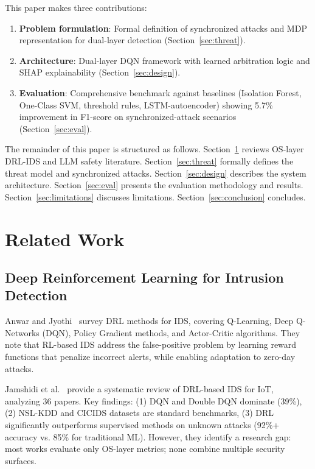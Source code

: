 \documentclass[conference]{IEEEtran}
\begin{document}
This paper makes three contributions:
\begin{enumerate}
\item \textbf{Problem formulation}: Formal definition of synchronized attacks and MDP representation for dual-layer detection (Section~\ref{sec:threat}).
\item \textbf{Architecture}: Dual-layer DQN framework with learned arbitration logic and SHAP explainability (Section~\ref{sec:design}).
\item \textbf{Evaluation}: Comprehensive benchmark against baselines (Isolation Forest, One-Class SVM, threshold rules, LSTM-autoencoder) showing 5.7\% improvement in F1-score on synchronized-attack scenarios (Section~\ref{sec:eval}).
\end{enumerate}

The remainder of this paper is structured as follows. Section~\ref{sec:related} reviews OS-layer DRL-IDS and LLM safety literature. Section~\ref{sec:threat} formally defines the threat model and synchronized attacks. Section~\ref{sec:design} describes the system architecture. Section~\ref{sec:eval} presents the evaluation methodology and results. Section~\ref{sec:limitations} discusses limitations. Section~\ref{sec:conclusion} concludes.

\section{Related Work}\label{sec:related}

\subsection{Deep Reinforcement Learning for Intrusion Detection}

Anwar and Jyothi~\cite{anwar2023survey} survey DRL methods for IDS, covering Q-Learning, Deep Q-Networks (DQN), Policy Gradient methods, and Actor-Critic algorithms. They note that RL-based IDS address the false-positive problem by learning reward functions that penalize incorrect alerts, while enabling adaptation to zero-day attacks.

Jamshidi et al.~\cite{jamshidi2024application} provide a systematic review of DRL-based IDS for IoT, analyzing 36 papers. Key findings: (1) DQN and Double DQN dominate (39\%), (2) NSL-KDD and CICIDS datasets are standard benchmarks, (3) DRL significantly outperforms supervised methods on unknown attacks (92\%+ accuracy vs. 85\% for traditional ML). However, they identify a research gap: most works evaluate only OS-layer metrics; none combine multiple security surfaces.
\end{document}
